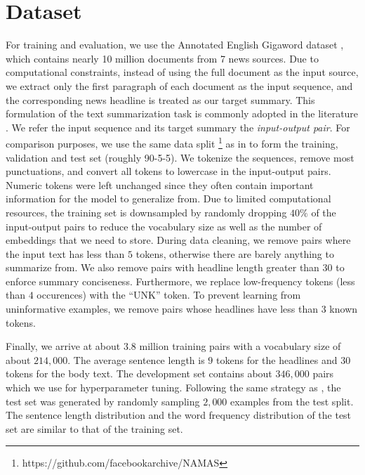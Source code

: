 \section{Dataset}
\label{sec: dataset}

For training and evaluation, we use the Annotated English Gigaword dataset \cite{graff2003english}, which contains nearly 10 million documents from 7 news sources. Due to computational constraints, instead of using the full document as the input source, we extract only the first paragraph of each document as the input sequence, and the corresponding news headline is treated as our target summary. This formulation of the text summarization task is commonly adopted in the literature \cite{rush2015neural}. We refer the input sequence and its target summary the \textit{input-output pair}. For comparison purposes, we use the same data split \footnote{https://github.com/facebookarchive/NAMAS} as in \cite{rush2015neural} to form the training, validation and test set (roughly 90-5-5). We tokenize the sequences, remove most punctuations, and convert all tokens to lowercase in the input-output pairs. Numeric tokens were left unchanged since they often contain important information for the model to generalize from. Due to limited computational resources, the training set is downsampled by randomly dropping $40\%$ of the input-output pairs to reduce the vocabulary size as well as the number of embeddings that we need to store. During data cleaning, we remove pairs where the input text has less than $5$ tokens, otherwise there are barely anything to summarize from. We also remove pairs with headline length greater than $30$ to enforce summary conciseness. Furthermore, we replace low-frequency tokens (less than $4$ occurences) with the ``UNK'' token. To prevent learning from uninformative examples, we remove pairs whose headlines have less than $3$ known tokens. 

Finally, we arrive at about $3.8$ million training pairs with a vocabulary size of about $214,000$. The average sentence length is $9$ tokens for the headlines and $30$ tokens for the body text. The development set contains about $346,000$ pairs which we use for hyperparameter tuning. Following the same strategy as \cite{rush2015neural}, the test set was generated by randomly sampling $2,000$ examples from the test split. The sentence length distribution and the word frequency distribution of the test set are similar to that of the training set.
